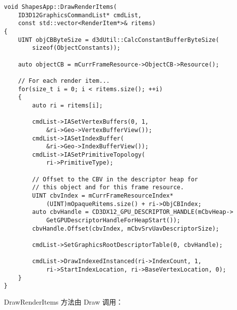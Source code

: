 \begin{lstlisting}
void ShapesApp::DrawRenderItems(
    ID3D12GraphicsCommandList* cmdList, 
    const std::vector<RenderItem*>& ritems)
{
    UINT objCBByteSize = d3dUtil::CalcConstantBufferByteSize(
        sizeof(ObjectConstants));
 
    auto objectCB = mCurrFrameResource->ObjectCB->Resource();

    // For each render item...
    for(size_t i = 0; i < ritems.size(); ++i)
    {
        auto ri = ritems[i];

        cmdList->IASetVertexBuffers(0, 1, 
            &ri->Geo->VertexBufferView());
        cmdList->IASetIndexBuffer(
            &ri->Geo->IndexBufferView());
        cmdList->IASetPrimitiveTopology(
            ri->PrimitiveType);

        // Offset to the CBV in the descriptor heap for 
        // this object and for this frame resource.
        UINT cbvIndex = mCurrFrameResourceIndex*
            (UINT)mOpaqueRitems.size() + ri->ObjCBIndex;
        auto cbvHandle = CD3DX12_GPU_DESCRIPTOR_HANDLE(mCbvHeap->
            GetGPUDescriptorHandleForHeapStart());
        cbvHandle.Offset(cbvIndex, mCbvSrvUavDescriptorSize);

        cmdList->SetGraphicsRootDescriptorTable(0, cbvHandle);

        cmdList->DrawIndexedInstanced(ri->IndexCount, 1, 
            ri->StartIndexLocation, ri->BaseVertexLocation, 0);
    }
}
\end{lstlisting}

\begin{flushleft}
DrawRenderItems 方法由 Draw 调用：\\
\end{flushleft}

